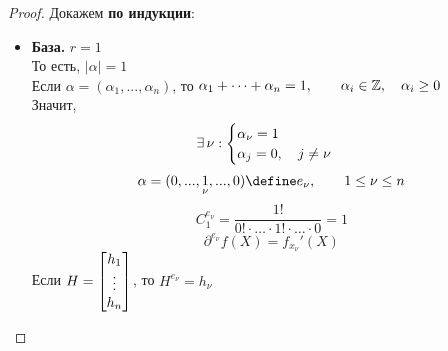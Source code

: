 \begin{proof}
	Докажем \textbf{по индукции}:
	\begin{itemize}
		\item \textbf{База.} $ r = 1 $ \\
		То есть, $ |\alpha| = 1 $ \\
		Если $ \alpha = (\alpha_1, ..., \alpha_n) $, то $ \alpha_1 + \dots + \alpha_n = 1, \qquad \alpha_i \in \mathbb{Z}, \quad \alpha_i \ge 0 $ \\
		Значит,
		$$ \exists\, \nu :
		\begin{cases}
			\alpha_\nu = 1 \\
			\alpha_j = 0, \quad j \ne \nu
		\end{cases} $$
		$$ \alpha = (0, ..., \underset\nu1, ..., 0) \define e_\nu, \qquad 1 \le \nu \le n $$
		$$ C_1^{e_\nu} = \frac{1!}{0! \cdot \dots \cdot 1! \cdot \dots \cdot 0} = 1 $$
		$$ \partial^{e_\nu} f(X) = f_{x_\nu}'(X) $$
		Если $ H =  \begin{bmatrix} {h_1} \\ \vdots \\ {h_n} \end{bmatrix}  $, то $ H^{e_\nu} = h_\nu $


\end{itemize}
\end{proof}
